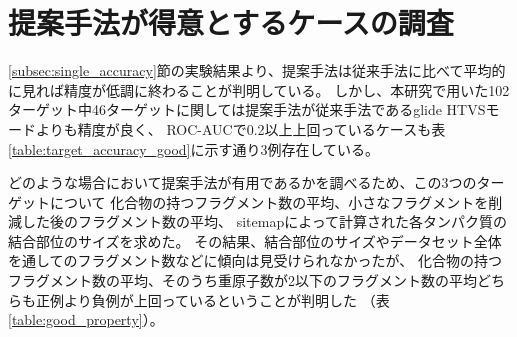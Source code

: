 \newpage

\section{提案手法が得意とするケースの調査}
\ref{subsec:single_accuracy}節の実験結果より、提案手法は従来手法に比べて平均的に見れば精度が低調に終わることが判明している。
しかし、本研究で用いた102ターゲット中46ターゲットに関しては提案手法が従来手法であるglide HTVSモードよりも精度が良く、
ROC-AUCで0.2以上上回っているケースも表\ref{table:target_accuracy_good}に示す通り3例存在している。

どのような場合において提案手法が有用であるかを調べるため、この3つのターゲットについて
化合物の持つフラグメント数の平均、小さなフラグメントを削減した後のフラグメント数の平均、
sitemap\cite{Halgren2009}によって計算された各タンパク質の結合部位のサイズを求めた。
その結果、結合部位のサイズやデータセット全体を通してのフラグメント数などに傾向は見受けられなかったが、
化合物の持つフラグメント数の平均、そのうち重原子数が2以下のフラグメント数の平均どちらも正例より負例が上回っているということが判明した
（表\ref{table:good_property}）。

